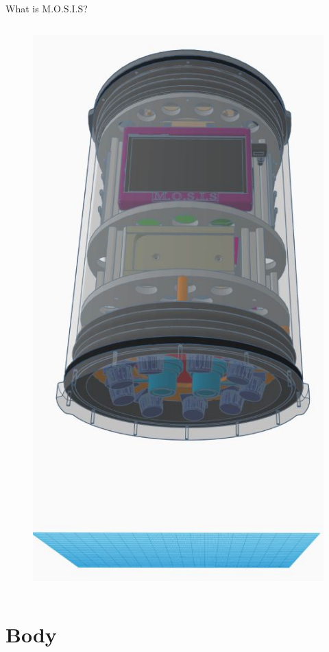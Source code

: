 \documentclass[17pt, aspectratio=169]{beamer}
\begin{document}
\begin{frame}{What is M.O.S.I.S?}
\begin{columns}
		\centering
		\begin{figure}
			\includegraphics[height=0.85\textheight]{./Figures/M.O.S.I.S_Model.jpeg}
		\end{figure}
	\end{columns}
\end{frame}
\section{Body}
\end{document}
